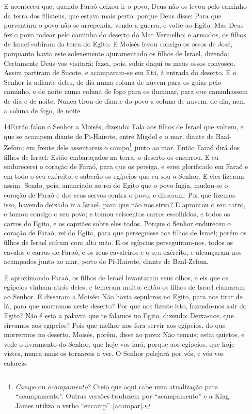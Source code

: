 E aconteceu que, quando Faraó deixou ir o povo, Deus não os levou
pelo caminho da terra dos filisteus, que estava mais perto; porque
Deus disse: Para que porventura o povo não se arrependa, vendo a
guerra, e volte ao Egito. Mas Deus fez o povo rodear pelo
caminho do deserto do Mar Vermelho; e armados, os filhos de Israel
subiram da terra do Egito. E Moisés levou consigo os ossos de
José, porquanto havia este solenemente ajuramentado os filhos de
Israel, dizendo: Certamente Deus vos visitará; fazei, pois, subir
daqui os meus ossos convosco. Assim partiram de Sucote, e
acamparam-se em Etã, à entrada do deserto. E o Senhor ia
adiante deles, de dia numa coluna de nuvem para os guiar pelo
caminho, e de noite numa coluna de fogo para os iluminar, para que
caminhassem de dia e de noite. Nunca tirou de diante do povo
a coluna de nuvem, de dia, nem a coluna de fogo, de noite.

\medskip

\lettrine{14} Então falou o Senhor a Moisés, dizendo: Fala
aos filhos de Israel que voltem, e que se acampem diante de
Pi-Hairote, entre Migdol e o mar, diante de Baal-Zefom; em frente
dele assentareis o campo\footnote{\emph{Campo} ou
\emph{acampamento}? Creio que aqui cabe uma atualização para
``acampamento''. Outras versões traduzem por ``acampamento'' e a
King James utiliza o verbo ``encamp'' (acampar).} junto ao mar.
Então Faraó dirá dos filhos de Israel: Estão embaraçados na
terra, o deserto os encerrou. E eu endurecerei o coração de
Faraó, para que os persiga, e serei glorificado em Faraó e em todo o
seu exército, e saberão os egípcios que eu sou o Senhor. E eles
fizeram assim. Sendo, pois, anunciado ao rei do Egito que o povo
fugia, mudou-se o coração de Faraó e dos seus servos contra o povo,
e disseram: Por que fizemos isso, havendo deixado ir a Israel, para
que não nos sirva? E aprontou o seu carro, e tomou consigo o seu
povo; e tomou seiscentos carros escolhidos, e todos os carros do
Egito, e os capitães sobre eles todos. Porque o Senhor endureceu
o coração de Faraó, rei do Egito, para que perseguisse aos filhos de
Israel; porém os filhos de Israel saíram com alta mão. E os
egípcios perseguiram-nos, todos os cavalos e carros de Faraó, e os
seus cavaleiros e o seu exército, e alcançaram-nos acampados junto
ao mar, perto de Pi-Hairote, diante de Baal-Zefom.

E aproximando Faraó, os filhos de Israel levantaram seus olhos, e
eis que os egípcios vinham atrás deles, e temeram muito; então os
filhos de Israel clamaram ao Senhor. E disseram a Moisés: Não
havia sepulcros no Egito, para nos tirar de lá, para que morramos
neste deserto? Por que nos fizeste isto, fazendo-nos sair do Egito?
Não é esta a palavra que te falamos no Egito, dizendo:
Deixa-nos, que sirvamos aos egípcios? Pois que melhor nos fora
servir aos egípcios, do que morrermos no deserto. Moisés,
porém, disse ao povo: Não temais; estai quietos, e vede o livramento
do Senhor, que hoje vos fará; porque aos egípcios, que hoje vistes,
nunca mais os tornareis a ver. O Senhor pelejará por vós, e
vós vos calareis.

